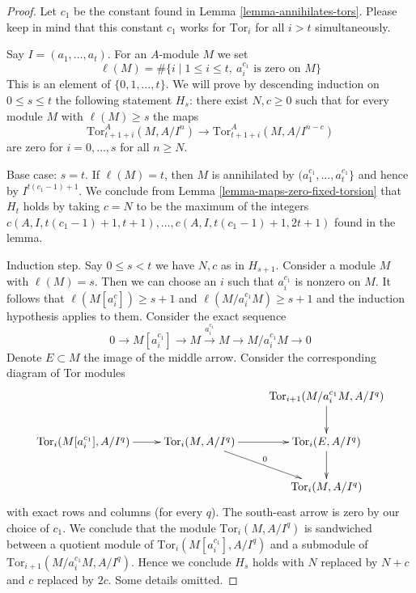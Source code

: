 \documentclass[10pt,a4paper]{amsart}
\theoremstyle{plain}
\theoremstyle{definition}
\theoremstyle{remark}
\numberwithin{equation}{subsection}
\begin{document}
\begin{proof}
Let $c_1$ be the constant found in Lemma \ref{lemma-annihilates-tors}.
Please keep in mind that this constant $c_1$ works for $\text{Tor}_i$ for all
$i > t$ simultaneously.

\medskip\noindent
Say $I = (a_1, \ldots, a_t)$. For an $A$-module $M$ we set
$$
\ell(M) =
\#\{i \mid 1 \leq i \leq t,\ a_i^{c_1}\text{ is zero on }M\}
$$
This is an element of $\{0, 1, \ldots, t\}$.
We will prove by descending induction on $0 \leq s \leq t$
the following statement $H_s$: there exist $N, c \geq 0$ such that
for every module $M$ with $\ell(M) \geq s$ the maps
$$
\text{Tor}_{t + 1 + i}^A(M, A/I^n) \to \text{Tor}_{t + 1 + i}^A(M, A/I^{n - c})
$$
are zero for $i = 0, \ldots, s$ for all $n \geq N$.

\medskip\noindent
Base case: $s = t$. If $\ell(M) = t$, then $M$ is annihilated by
$(a_1^{c_1}, \ldots, a_t^{c_1}\}$ and hence by
$I^{t(c_1 - 1) + 1}$. We conclude from
Lemma \ref{lemma-maps-zero-fixed-torsion}
that $H_t$ holds by taking $c = N$ to be the maximum of the integers
$c(A, I, t(c_1 - 1) + 1, t + 1), \ldots, c(A, I, t(c_1 - 1) + 1, 2t + 1)$
found in the lemma.

\medskip\noindent
Induction step. Say $0 \leq s < t$ we have $N, c$ as in $H_{s + 1}$.
Consider a module $M$ with $\ell(M) = s$. Then we can choose an $i$
such that $a_i^{c_1}$ is nonzero on $M$. It follows that
$\ell(M[a_i^c]) \geq s + 1$ and $\ell(M/a_i^{c_1}M) \geq s + 1$
and the induction hypothesis applies to them.
Consider the exact sequence
$$
0 \to M[a_i^{c_1}] \to M \xrightarrow{a_i^{c_1}} M \to M/a_i^{c_1}M \to 0
$$
Denote $E \subset M$ the image of the middle arrow.
Consider the corresponding diagram of Tor modules
$$
\xymatrix{
&
&
\text{Tor}_{i + 1}(M/a_i^{c_1}M, A/I^q) \ar[d] \\
\text{Tor}_i(M[a_i^{c_1}], A/I^q) \ar[r] &
\text{Tor}_i(M, A/I^q) \ar[r] \ar[rd]^0 &
\text{Tor}_i(E, A/I^q) \ar[d] \\
&
&
\text{Tor}_i(M, A/I^q)
}
$$
with exact rows and columns (for every $q$). The south-east arrow
is zero by our choice of $c_1$. We conclude that the
module $\text{Tor}_i(M, A/I^q)$ is sandwiched between
a quotient module of $\text{Tor}_i(M[a_i^{c_1}], A/I^q)$
and a submodule of $\text{Tor}_{i + 1}(M/a_i^{c_1}M, A/I^q)$.
Hence we conclude $H_s$ holds with $N$ replaced by $N + c$
and $c$ replaced by $2c$. Some details omitted.
\end{proof}
\end{document}
